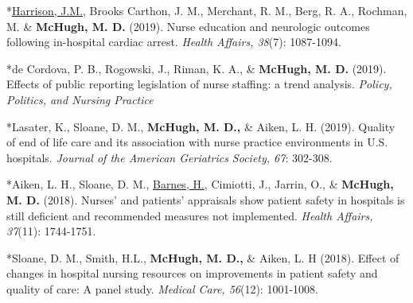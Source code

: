 \documentclass[10pt,]{article}
\begin{document}
{{{{{{{{{{{{{{{\begin{hangparas}{.25in}{1}
\end{hangparas}


\begin{hangparas}{.25in}{1}

*{\underline {Harrison, J.M.}}, Brooks Carthon, J. M., Merchant, R. M., Berg, R. A., Rochman, M. \& {\textbf {McHugh, M. D.}} (2019). Nurse education and neurologic outcomes following in-hospital cardiac arrest. {\textit {Health Affairs, 38}}(7): 1087-1094.

\end{hangparas}



\begin{hangparas}{.25in}{1}

*de Cordova, P. B., Rogowski, J., Riman, K. A., \& {\textbf {McHugh, M. D.}} (2019). Effects of public reporting legislation of nurse staffing: a trend analysis. {\textit {Policy, Politics, and Nursing Practice}}

\end{hangparas}



\begin{hangparas}{.25in}{1}

*Lasater, K., Sloane, D. M., {\textbf {McHugh, M. D.,}} \& Aiken, L. H. (2019). Quality of end of life care and its association with nurse practice environments in U.S. hospitals. {\textit {Journal of the American Geriatrics Society, 67}}: 302-308.

\end{hangparas}



\begin{hangparas}{.25in}{1}

*Aiken, L. H., Sloane, D. M., {\underline {Barnes, H.}}, Cimiotti, J., Jarrin, O., \& {\textbf {McHugh, M. D.}} (2018). Nurses’ and patients’ appraisals show patient safety in hospitals is still deficient and recommended measures not implemented. {\textit {Health Affairs, 37}}(11): 1744-1751.

\end{hangparas}



\begin{hangparas}{.25in}{1}

*Sloane, D. M., Smith, H.L., {\textbf {McHugh, M. D.,}} \& Aiken, L. H (2018). Effect of changes in hospital nursing resources on improvements in patient safety and quality of care: A panel study. {\textit {Medical Care, 56}}(12): 1001-1008.


\end{hangparas}}}}}}}}}}}}}}}}
\end{document}
